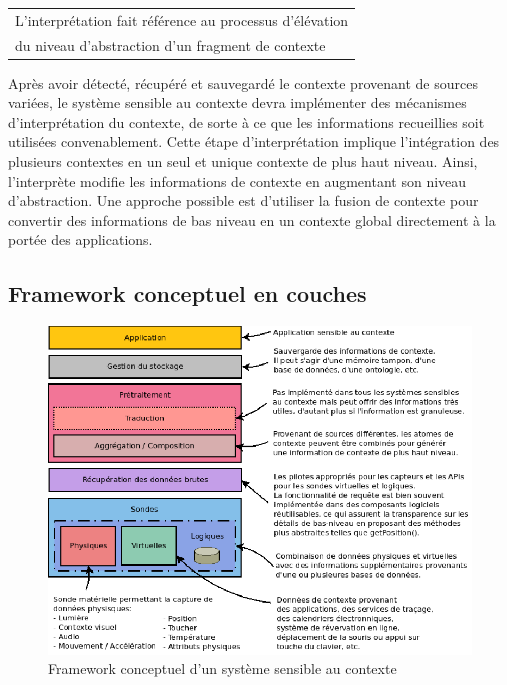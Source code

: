 {%
    \centering
    \begin{tabular}{l}
        L'interprétation fait référence au processus d'élévation \\
        du niveau d'abstraction d'un fragment de contexte
        \cite{dey_conceptual_2001} \\
    \end{tabular}
\par}%

Après avoir détecté, récupéré et sauvegardé le contexte provenant de sources
variées, le système sensible au contexte devra implémenter des mécanismes
d'interprétation du contexte, de sorte à ce que les informations recueillies
soit utilisées convenablement. Cette étape d'interprétation implique
l'intégration des plusieurs contextes en un seul et unique contexte de plus haut
niveau. Ainsi, l'interprète modifie les informations de contexte en augmentant
son niveau d'abstraction. Une approche possible est d'utiliser la fusion de contexte
pour convertir des informations de bas niveau en un contexte global directement
à la portée des applications.

\subsection{Framework conceptuel en couches}

\begin{figure}[H]
    \centering
    \includegraphics[width=.7\textwidth]{img/layered_conceptual_framework}
    \caption{Framework conceptuel d'un système sensible au contexte}
    \label{archi}
\end{figure}

